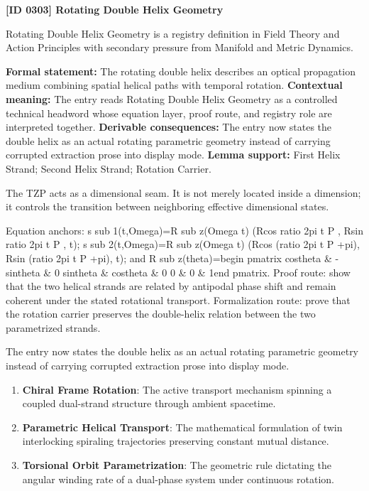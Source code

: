 \clearpage
\noindent\textbf{[ID 0303] Rotating Double Helix Geometry}\par
\vspace{0.35em}
\begingroup\small
{}
Rotating Double Helix Geometry is a registry definition in Field Theory and Action Principles with secondary pressure from Manifold and Metric Dynamics.

\begingroup\footnotesize\setlength{\emergencystretch}{3em}\sloppy
\textbf{Formal statement:} The rotating double helix describes an optical propagation medium combining spatial helical paths with temporal rotation. \textbf{Contextual meaning:} The entry reads Rotating Double Helix Geometry as a controlled technical headword whose equation layer, proof route, and registry role are interpreted together. \textbf{Derivable consequences:} The entry now states the double helix as an actual rotating parametric geometry instead of carrying corrupted extraction prose into display mode. \textbf{Lemma support:} First Helix Strand; Second Helix Strand; Rotation Carrier.\par
\endgroup

The TZP acts as a dimensional seam. It is not merely located inside a dimension; it controls the transition between neighboring effective dimensional states.

Equation anchors: s sub 1(t,Omega)=R sub z(Omega t) (Rcos ratio 2pi t P , Rsin ratio 2pi t P , t); s sub 2(t,Omega)=R sub z(Omega t) (Rcos (ratio 2pi t P +pi), Rsin (ratio 2pi t P +pi), t); and R sub z(theta)=begin pmatrix costheta \& -sintheta \& 0 sintheta \& costheta \& 0 0 \& 0 \& 1end pmatrix. Proof route: show that the two helical strands are related by antipodal phase shift and remain coherent under the stated rotational transport. Formalization route: prove that the rotation carrier preserves the double-helix relation between the two parametrized strands.

The entry now states the double helix as an actual rotating parametric geometry instead of carrying corrupted extraction prose into display mode.
\endgroup

\begin{enumerate}[leftmargin=1.6em,itemsep=6pt,topsep=4pt]
\item \textbf{Chiral Frame Rotation}: The active transport mechanism spinning a coupled dual-strand structure through ambient spacetime.
\item \textbf{Parametric Helical Transport}: The mathematical formulation of twin interlocking spiraling trajectories preserving constant mutual distance.
\item \textbf{Torsional Orbit Parametrization}: The geometric rule dictating the angular winding rate of a dual-phase system under continuous rotation.
\end{enumerate}

